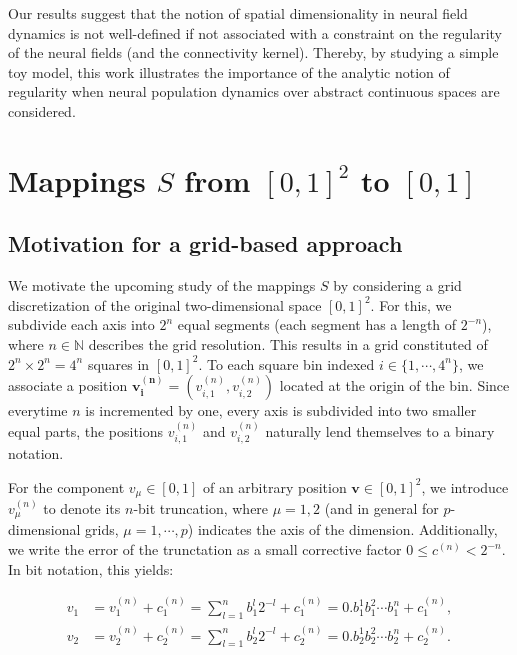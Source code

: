 \documentclass[10pt,letterpaper]{article}
\renewcommand{\vec}[1]{\boldsymbol{#1}}
\begin{document}



Our results suggest that the notion of spatial dimensionality in neural field dynamics is not well-defined if not associated with a constraint on the regularity of the neural fields (and the connectivity kernel). Thereby, by studying a simple toy model, this work illustrates the importance of the analytic notion of regularity when neural population dynamics over abstract continuous spaces are considered. 

\section{Mappings $S$ from $[0,1]^2$ to $[0,1]$}

\subsection{Motivation for a grid-based approach} \label{sec:grid-motivation}

We motivate the upcoming study of the mappings $S$ by considering a grid discretization of the original two-dimensional space $[0,1]^2$. For this, we subdivide each axis into $2^n$ equal segments (each segment has a length of $2^{-n}$), where $n \in \mathbb{N}$ describes the grid resolution. This results in a grid constituted of $2^n \times 2^n = 4^n$ squares in $[0,1]^2$. To each square bin indexed $i \in \{1,\cdots,4^n\}$, we associate a position $\vec{v_i^{(n)}} = (v_{i,1}^{(n)}, v_{i,2}^{(n)})$ located at the origin of the bin. Since everytime $n$ is incremented by one, every axis is subdivided into two smaller equal parts, the positions $v_{i,1}^{(n)}$ and $v_{i,2}^{(n)}$ naturally lend themselves to a binary notation.

For the component $v_\mu \in [0,1]$ of an arbitrary position $\vec{v} \in [0,1]^2$, we introduce $v_\mu^{(n)}$ to denote its $n$-bit truncation, where $\mu = 1,2$ (and in general for $p$-dimensional grids, $\mu=1, \cdots, p$) indicates the axis of the dimension. Additionally, we write the error of the trunctation as a small corrective factor $0 \leq c^{(n)} < 2^{-n}$. In bit notation, this yields: 

\begin{equation} \begin{aligned} \label{eq:positions-v}
v_1 &= v_1^{(n)} + c_1^{(n)} = \sum_{l=1}^n b_1^l 2^{-l} + c_1^{(n)} = 0.b_1^1 b_1^2 \cdots b_1^n + c_1^{(n)}, \\
v_2 &= v_2^{(n)} + c_2^{(n)} = \sum_{l=1}^n b_2^l 2^{-l} + c_2^{(n)} = 0.b_2^1 b_2^2 \cdots b_2^n + c_2^{(n)}.
\end{aligned}\end{equation}
\end{document}
